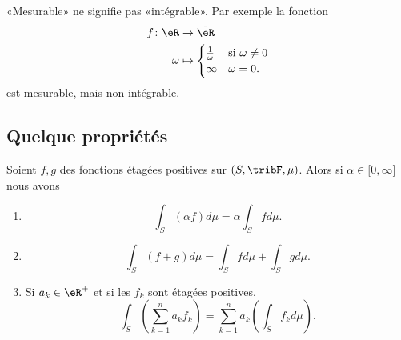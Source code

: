 \begin{remark}
    «Mesurable» ne signifie pas «intégrable». Par exemple la fonction 
    \begin{equation}
        \begin{aligned}
            f\colon \eR&\to \bar\eR \\
            \omega&\mapsto\begin{cases}
            \frac{1}{ \omega }    &   \text{si $ \omega\neq 0$}\\
            \infty    &    \text{$\omega=0$}.
            \end{cases}
        \end{aligned}
    \end{equation}
    est mesurable, mais non intégrable.
\end{remark}

\subsection{Quelque propriétés}

\begin{theorem}        \label{ThoooCZCXooVvNcFD}
    Soient \( f,g\) des fonctions étagées positives sur \( (S,\tribF,\mu)\). Alors si \( \alpha\in\mathopen[ 0 , \infty \mathclose]\) nous avons
    \begin{enumerate}
        \item
            \begin{equation}
                \int_S(\alpha f)d\mu=\alpha\int_Sfd\mu.
            \end{equation}
        \item
            \begin{equation}
                \int_S(f+g)d\mu=\int_Sfd\mu+\int_Sgd\mu.
            \end{equation}
        \item\label{ITEMooOJRAooQkoQyD}
    Si \( a_k\in \eR^+\) et si les \( f_k\) sont étagées positives,
    \begin{equation}
        \int_S\left( \sum_{k=1}^na_kf_k \right)=\sum_{k=1}^na_k\left( \int_S f_kd\mu \right).
    \end{equation}
    \end{enumerate}
\end{theorem}

